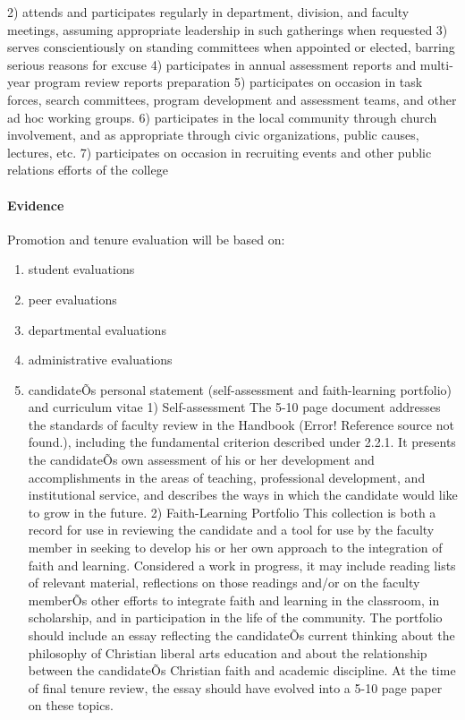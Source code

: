 \documentclass[letterpaper, 11pt]{article}
\begin{document}
\begin{enumerate}[label=\alph*)]
					2) attends and participates regularly in department, division, and faculty meetings, assuming appropriate leadership in such gatherings when requested
					3) serves conscientiously on standing committees when appointed or elected, barring serious reasons for excuse
					4) participates in annual assessment reports and multi-year program review reports preparation
					5) participates on occasion in task forces, search committees, program development and assessment teams, and other ad hoc working groups.
					6) participates in the local community through church involvement, and as appropriate through civic organizations, public causes, lectures, etc.
					7) participates on occasion in recruiting events and other public relations efforts of the college
				\end{enumerate}

			\paragraph{Evidence}
				Promotion and tenure evaluation will be based on:
				\begin{enumerate}[label=\alph*)]
					\item{student evaluations}
					\item{peer evaluations}
					\item{departmental evaluations}
					\item{administrative evaluations}
					\item{candidateÕs personal statement (self-assessment and faith-learning portfolio) and curriculum vitae}
					1) Self-assessment
					The 5-10 page document addresses the standards of faculty review in the Handbook (Error! Reference source not found.), including the fundamental criterion described under 2.2.1.  It presents the candidateÕs own assessment of his or her development and accomplishments in the areas of teaching, professional development, and institutional service, and describes the ways in which the candidate would like to grow in the future.
					2) Faith-Learning Portfolio
					This collection is both a record for use in reviewing the candidate and a tool for use by the faculty member in seeking to develop his or her own approach to the integration of faith and learning.  Considered a work in progress, it may include reading lists of relevant material, reflections on those readings and/or on the faculty memberÕs other efforts to integrate faith and learning in the classroom, in scholarship, and in participation in the life of the community.  The portfolio should include an essay reflecting the candidateÕs current thinking about the philosophy of Christian liberal arts education and about the relationship between the candidateÕs Christian faith and academic discipline.  At the time of final tenure review, the essay should have evolved into a 5-10 page paper on these topics.
				\end{enumerate}
\end{document}
